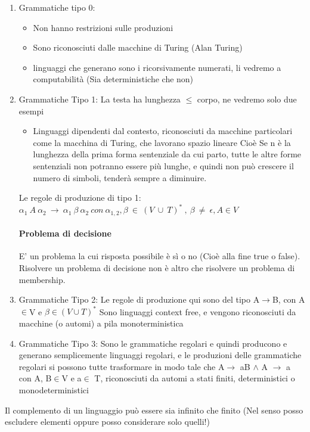 \documentclass[12pt, a4paper, openany, oneside]{book}
\begin{document}
\begin{enumerate}
	\item Grammatiche tipo 0: %
	\begin{itemize}
		\item Non hanno restrizioni sulle produzioni
		\item Sono riconosciuti dalle macchine di Turing (Alan Turing)
		\item linguaggi che generano sono i ricorsivamente numerati, li vedremo a 
		computabilità (Sia deterministiche che non)
	\end{itemize}
	\item Grammatiche Tipo 1: La testa ha lunghezza $\leq$ corpo, ne vedremo 
	solo due esempi
	\begin{itemize}
		\item Linguaggi dipendenti dal contesto, riconosciuti da macchine 
		particolari come la macchina di Turing, che lavorano spazio lineare
		Cioè Se n è la lunghezza della prima forma sentenziale da cui parto, 
		tutte le altre forme sentenziali non potranno essere più lunghe, e quindi
		non può crescere il numero di simboli, tenderà sempre a diminuire.
	\end{itemize}
	Le regole di produzione di tipo 1:
	$\alpha _{1} ~ A ~ \alpha _{2} ~ \to ~ \alpha _{1}~ \beta ~ \alpha_{2} ~ con ~ \alpha _{1,2}
	,\beta ~ \in ~ (V ~ \cup ~ T)^{*} ~ , ~ \beta ~ \neq ~ \epsilon, A\in V$
	\paragraph{Problema di decisione} E' un problema la cui risposta possibile è
	sì o no (Cioè alla fine true o false). Risolvere un problema di decisione non 
	è altro che risolvere un problema di membership.
	\item Grammatiche Tipo 2: 
	Le regole di produzione qui sono del tipo A$\to$B, con A$\in$V e 
	$\beta \in(V \cup T)^{*}$
	Sono linguaggi context free, e vengono riconosciuti da macchine (o automi) a
	pila monoterministica
	\item Grammatiche Tipo 3: Sono le grammatiche regolari e quindi producono e
	generano semplicemente linguaggi regolari, e le produzioni delle grammatiche
	regolari si possono tutte trasformare in modo tale che A$\to$ aB $\wedge$ A
	$\to$ a con A, B$\in$V e a$\in$ T, riconosciuti da automi a stati finiti, 
	deterministici o monodeterministici
\end{enumerate}
Il complemento di un linguaggio può essere sia infinito che finito (Nel senso
posso escludere elementi oppure posso considerare solo quelli!)
\\ \\ 
\end{document}
